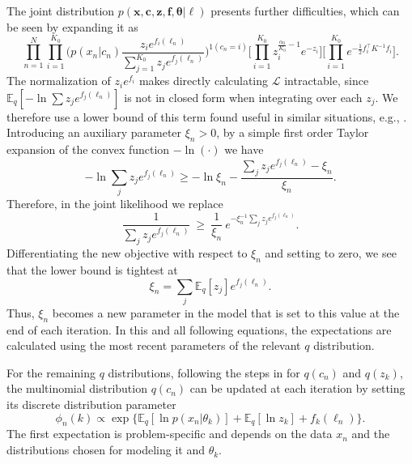 \documentclass[runningheads,a4paper]{iscide}
\newcommand{\bs}[1]{\boldsymbol{#1}}
\begin{document}
The joint distribution $p(\bs{x},\bs{c},\bs{z},\bs{f},\bs{\theta}|\bs{\ell})$ presents further difficulties, which can be seen by expanding it as
\begin{equation}
\prod_{n=1}^{N}\prod_{i=1}^{K_0}\Big( p(x_n|c_n)\frac{z_i
e^{f_i(\ell_n)}}{\sum_{j=1}^{K_0} z_j e^{f_j(\ell_n)}}
\Big)^{1(c_n=i)}\Big[\prod_{i=1}^{K_0} z_i^{\frac{\alpha_0}{K_0}-1}e^{-z_i}\Big]
\Big[ \prod_{i=1}^{K_0} e^{-\frac{1}{2}{f}_i^\top K^{-1}
{f}_i}\Big]. \label{eqn_zfc}
\end{equation}
The normalization of $z_i e^{f_i}$ makes directly calculating $\mathcal{L}$ intractable, since \linebreak $\mathbb{E}_q[-\ln \sum z_j e^{f_j(\ell_n)}]$ is not in closed form when integrating over each $z_j$.
We therefore use a lower bound of this term found useful in similar situations, e.g., \cite{Paisley12DILN}. Introducing an auxiliary parameter $\xi_n > 0$, by a simple first order Taylor expansion of the convex function $-\ln(\cdot)$ we have
\begin{equation}
-\ln \sum_j z_j e^{f_j(\ell_n)}\geq -\ln\xi_n -\frac{\sum_j z_j
e^{f_j(\ell_n)}-\xi_n}{\xi_n}.
\end{equation}
Therefore, in the joint likelihood we replace
\begin{equation}
\frac{1}{\sum_j z_j e^{f_j(\ell_n)}} ~\geq~ \frac{1}{\xi_n}
~e^{-\xi_n^{-1}\sum_j z_j e^{f_j(\ell_n)}}.
\end{equation}
Differentiating the new objective with respect to  $\xi_n$ and setting to zero, we see that the lower bound is tightest at
\begin{equation}
\textstyle\xi_n =\sum_j \mathbb{E}_q [z_j] e^{f_j(\ell_n)} . \label{eqnxin}
\end{equation}
Thus, $\xi_n$ becomes a new parameter in the model that is set to this value at the end of each iteration. In this and all following equations, the expectations are calculated using the most recent parameters of the relevant $q$ distribution.

For the remaining $q$ distributions, following the steps in \cite{Bishop06prml} for $q(c_n)$ and $q(z_k)$, the multinomial distribution $q(c_n)$ can be updated at each iteration by setting its discrete distribution parameter
\begin{equation}\label{eqnqcn}
 \phi_n(k) \propto \exp\{\mathbb{E}_q[\ln p(x_n|\theta_k)] + \mathbb{E}_q[\ln z_k] + f_k(\ell_n)\}.
\end{equation}
The first expectation is problem-specific and depends on the data $x_n$ and the distributions chosen for modeling it and $\theta_k$.
\end{document}
